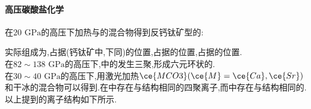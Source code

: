 \documentclass{ctexart}
\begin{document}
\paragraph{高压碳酸盐化学}
在$20\text{ GPa}$的高压下加热与的混合物得到反钙钛矿型的:
\begin{center}
\end{center}
实际组成为,占据(钙钛矿中,下同)的位置,占据的位置,占据的位置.\\
\indent 在$82\sim138\text{ GPa}$的高压下,中的发生三聚,形成六元环状的.\\
\indent 在$30\sim40\text{ GPa}$的高压下,用激光加热$\ce{MCO3}(\ce{M}=\ce{Ca},\ce{Sr})$和干冰的混合物可以得到.在中存在与结构相同的四聚离子,而中存在与结构相同的.\\
\indent 以上提到的离子结构如下所示.
\end{document}

